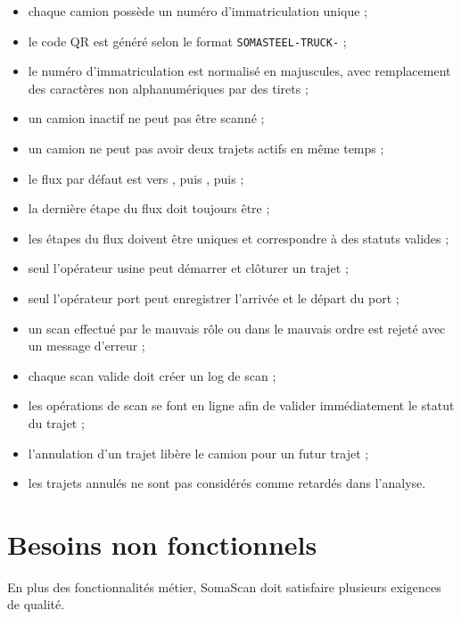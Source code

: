 \begin{itemize}
    \item chaque camion possède un numéro d'immatriculation unique ;
    \item le code QR est généré selon le format \texttt{SOMASTEEL-TRUCK-} ;
    \item le numéro d'immatriculation est normalisé en majuscules, avec remplacement des caractères non alphanumériques par des tirets ;
    \item un camion inactif ne peut pas être scanné ;
    \item un camion ne peut pas avoir deux trajets actifs en même temps ;
    \item le flux par défaut est  vers , puis , puis  ;
    \item la dernière étape du flux doit toujours être  ;
    \item les étapes du flux doivent être uniques et correspondre à des statuts valides ;
    \item seul l'opérateur usine peut démarrer et clôturer un trajet ;
    \item seul l'opérateur port peut enregistrer l'arrivée et le départ du port ;
    \item un scan effectué par le mauvais rôle ou dans le mauvais ordre est rejeté avec un message d'erreur ;
    \item chaque scan valide doit créer un log de scan ;
    \item les opérations de scan se font en ligne afin de valider immédiatement le statut du trajet ;
    \item l'annulation d'un trajet libère le camion pour un futur trajet ;
    \item les trajets annulés ne sont pas considérés comme retardés dans l'analyse.
\end{itemize}

\section{Besoins non fonctionnels}

En plus des fonctionnalités métier, SomaScan doit satisfaire plusieurs exigences de qualité.

